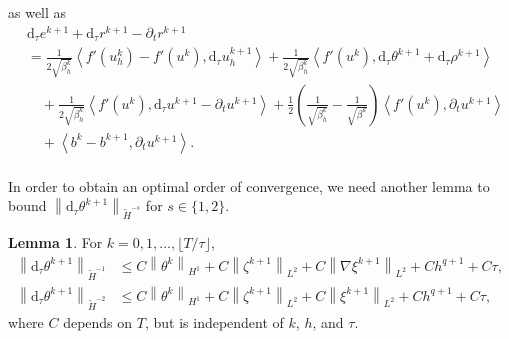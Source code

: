 \documentclass[11pt, reqno]{amsart}
\theoremstyle{definition}
\newtheorem{lemma}[theorem]{Lemma}
\numberwithin{equation}{section}
\newcommand{\dtt}{\mathrm{d}_\tau}
\newcommand{\norm}[2]{\left\|{#1}\right\|_{#2}}
\newcommand{\inpro}[2]{\left\langle#1,#2\right\rangle}
\begin{document}
as well as
\begin{align}
	\label{equ:fem euler sub r}
	&\dtt e^{k+1} + \dtt r^{k+1} - \partial_t r^{k+1}
	\nonumber\\
	&=
	\frac{1}{2\sqrt{\beta_h^k}}
	\inpro{f'(u_h^k)-f'(u^k)}{\dtt u_h^{k+1}}
	+
	\frac{1}{2\sqrt{\beta_h^k}} \inpro{f'(u^k)}{\dtt\theta^{k+1} + \dtt \rho^{k+1}}
	\nonumber\\
	&\quad
	+
	\frac{1}{2\sqrt{\beta_h^k}}
	\inpro{f'(u^k)}{\dtt u^{k+1}-\partial_t u^{k+1}}
	+
	\frac12 \left(\frac{1}{\sqrt{\beta_h^k}} - \frac{1}{\sqrt{\beta^k}}\right) \inpro{f'(u^k)}{\partial_t u^{k+1}}
	\nonumber\\
	&\quad
	+
	\inpro{b^k-b^{k+1}}{\partial_t u^{k+1}}.
\end{align}
\\
In order to obtain an optimal order of convergence, we need another lemma to bound $\norm{\dtt \theta^{k+1}}{\widetilde{H}^{-s}}$ for $s\in \{1,2\}$.


\begin{lemma}
For $k=0,1,\ldots, \lfloor T/\tau \rfloor$,
	\begin{align}
		\label{equ:dt theta H-1}
		\norm{\dtt \theta^{k+1}}{\widetilde{H}^{-1}}
		&\leq
		C\norm{\theta^k}{H^1}+ C\norm{\zeta^{k+1}}{L^2} + C\norm{\nabla \xi^{k+1}}{L^2} + Ch^{q+1} + C\tau,
		\\
		\label{equ:dt theta H-2}
		\norm{\dtt \theta^{k+1}}{\widetilde{H}^{-2}}
		&\leq
		C\norm{\theta^k}{H^1}+ C\norm{\zeta^{k+1}}{L^2} + C\norm{\xi^{k+1}}{L^2} + Ch^{q+1} + C\tau,
	\end{align}
	where $C$ depends on $T$, but is independent of $k$, $h$, and $\tau$.
\end{lemma}
\end{document}
